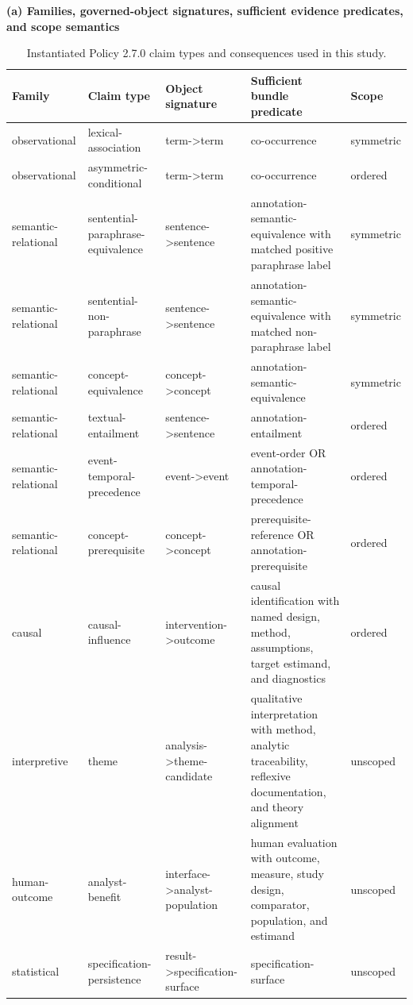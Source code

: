 \begin{table}[t]
  \caption{Instantiated Policy 2.7.0 claim types and consequences used in this study.}
  \label{tab:policy-claim-types}
  \centering
  \scriptsize
  \textbf{(a) Families, governed-object signatures, sufficient evidence predicates, and scope semantics}\par\smallskip
  \begin{tabular}{@{}p{}p{}p{}p{}p{}@{}}
    \toprule
    Family & Claim type & Object signature & Sufficient bundle predicate & Scope \\
    \midrule
    observational & lexical-association & term->term & co-occurrence & symmetric \\
    observational & asymmetric-conditional & term->term & co-occurrence & ordered \\
    semantic-relational & sentential-paraphrase-equivalence & sentence->sentence & annotation-semantic-equivalence with matched positive paraphrase label & symmetric \\
    semantic-relational & sentential-non-paraphrase & sentence->sentence & annotation-semantic-equivalence with matched non-paraphrase label & symmetric \\
    semantic-relational & concept-equivalence & concept->concept & annotation-semantic-equivalence & symmetric \\
    semantic-relational & textual-entailment & sentence->sentence & annotation-entailment & ordered \\
    semantic-relational & event-temporal-precedence & event->event & event-order OR annotation-temporal-precedence & ordered \\
    semantic-relational & concept-prerequisite & concept->concept & prerequisite-reference OR annotation-prerequisite & ordered \\
    causal & causal-influence & intervention->outcome & causal identification with named design, method, assumptions, target estimand, and diagnostics & ordered \\
    interpretive & theme & analysis->theme-candidate & qualitative interpretation with method, analytic traceability, reflexive documentation, and theory alignment & unscoped \\
    human-outcome & analyst-benefit & interface->analyst-population & human evaluation with outcome, measure, study design, comparator, population, and estimand & unscoped \\
    statistical & specification-persistence & result->specification-surface & specification-surface & unscoped \\

\end{tabular}
\end{table}
